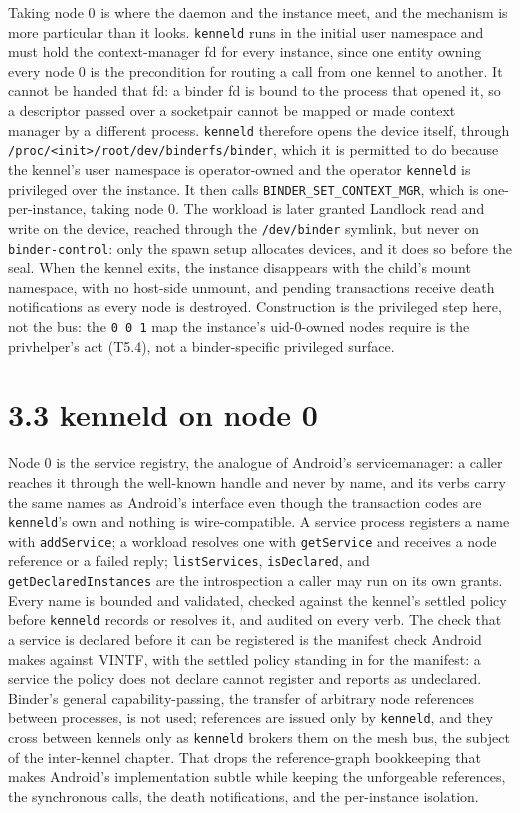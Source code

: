Taking node 0 is where the daemon and the instance meet, and the
mechanism is more particular than it looks. \texttt{kenneld} runs in the
initial user namespace and must hold the context-manager fd for every
instance, since one entity owning every node 0 is the precondition for
routing a call from one kennel to another. It cannot be handed that fd:
a binder fd is bound to the process that opened it, so a descriptor
passed over a socketpair cannot be mapped or made context manager by a
different process. \texttt{kenneld} therefore opens the device itself,
through
\texttt{/proc/\textless{}init\textgreater{}/root/dev/binderfs/binder},
which it is permitted to do because the kennel's user namespace is
operator-owned and the operator \texttt{kenneld} is privileged over the
instance. It then calls \texttt{BINDER\_SET\_CONTEXT\_MGR}, which is
one-per-instance, taking node 0. The workload is later granted Landlock
read and write on the device, reached through the \texttt{/dev/binder}
symlink, but never on \texttt{binder-control}: only the spawn setup
allocates devices, and it does so before the seal. When the kennel
exits, the instance disappears with the child's mount namespace, with no
host-side unmount, and pending transactions receive death notifications
as every node is destroyed. Construction is the privileged step here,
not the bus: the \texttt{0\ 0\ 1} map the instance's uid-0-owned nodes
require is the privhelper's act (T5.4), not a binder-specific privileged
surface.

\hypertarget{kenneld-on-node-0}{%
\section{3.3 kenneld on node 0}\label{kenneld-on-node-0}}

Node 0 is the service registry, the analogue of Android's
servicemanager: a caller reaches it through the well-known handle and
never by name, and its verbs carry the same names as Android's interface
even though the transaction codes are \texttt{kenneld}'s own and nothing
is wire-compatible. A service process registers a name with
\texttt{addService}; a workload resolves one with \texttt{getService}
and receives a node reference or a failed reply; \texttt{listServices},
\texttt{isDeclared}, and \texttt{getDeclaredInstances} are the
introspection a caller may run on its own grants. Every name is bounded
and validated, checked against the kennel's settled policy before
\texttt{kenneld} records or resolves it, and audited on every verb. The
check that a service is declared before it can be registered is the
manifest check Android makes against VINTF, with the settled policy
standing in for the manifest: a service the policy does not declare
cannot register and reports as undeclared. Binder's general
capability-passing, the transfer of arbitrary node references between
processes, is not used; references are issued only by \texttt{kenneld},
and they cross between kennels only as \texttt{kenneld} brokers them on
the mesh bus, the subject of the inter-kennel chapter. That drops the
reference-graph bookkeeping that makes Android's implementation subtle
while keeping the unforgeable references, the synchronous calls, the
death notifications, and the per-instance isolation.

